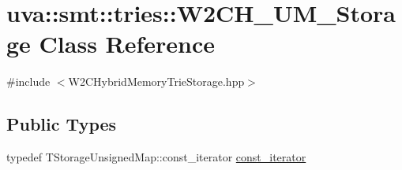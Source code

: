 \hypertarget{classuva_1_1smt_1_1tries_1_1_w2_c_h___u_m___storage}{}\section{uva\+:\+:smt\+:\+:tries\+:\+:W2\+C\+H\+\_\+\+U\+M\+\_\+\+Storage Class Reference}
\label{classuva_1_1smt_1_1tries_1_1_w2_c_h___u_m___storage}


{\ttfamily \#include $<$W2\+C\+Hybrid\+Memory\+Trie\+Storage.\+hpp$>$}

\subsection*{Public Types}
\begin{DoxyCompactItemize}
\item 
typedef T\+Storage\+Unsigned\+Map\+::const\+\_\+iterator \hyperlink{classuva_1_1smt_1_1tries_1_1_w2_c_h___u_m___storage_aa6f5f475e2692ac5bb6cb6780fcee90d}{const\+\_\+iterator}
\end{DoxyCompactItemize}
